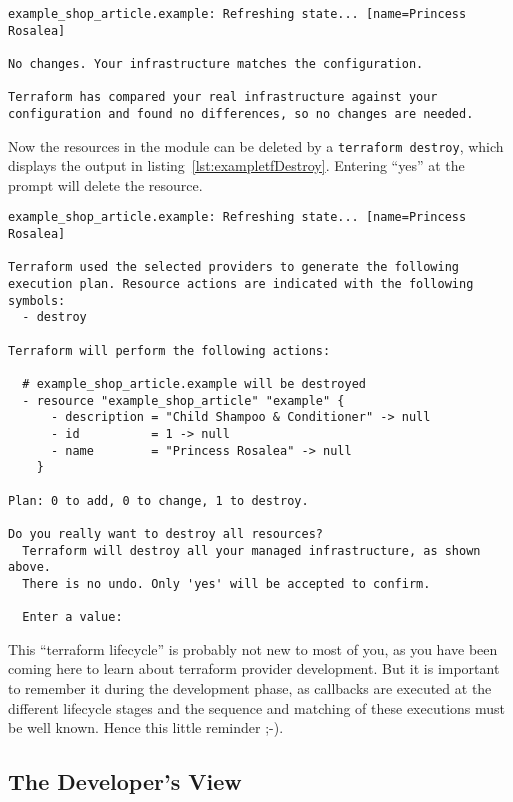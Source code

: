 \documentclass[paper=a4,11pt,numbers=noenddot]{article}
\begin{document}
\begin{lstlisting}[label=lst:exampletfPlanInSync]
example_shop_article.example: Refreshing state... [name=Princess Rosalea]

No changes. Your infrastructure matches the configuration.

Terraform has compared your real infrastructure against your configuration and found no differences, so no changes are needed.
\end{lstlisting}

Now the resources in the module can be deleted by a \verb'terraform destroy', which displays the output in listing~\ref{lst:exampletfDestroy}. Entering ``yes'' at the prompt will delete the resource.

\begin{lstlisting}[label=lst:exampletfDestroy]
example_shop_article.example: Refreshing state... [name=Princess Rosalea]

Terraform used the selected providers to generate the following execution plan. Resource actions are indicated with the following symbols:
  - destroy

Terraform will perform the following actions:

  # example_shop_article.example will be destroyed
  - resource "example_shop_article" "example" {
      - description = "Child Shampoo & Conditioner" -> null
      - id          = 1 -> null
      - name        = "Princess Rosalea" -> null
    }

Plan: 0 to add, 0 to change, 1 to destroy.

Do you really want to destroy all resources?
  Terraform will destroy all your managed infrastructure, as shown above.
  There is no undo. Only 'yes' will be accepted to confirm.

  Enter a value:
\end{lstlisting}

This ``terraform lifecycle'' is probably not new to most of you, as you have been coming here to learn about terraform provider development. But it is important to remember it during the development phase, as callbacks are executed at the different lifecycle stages and the sequence and matching of these executions must be well known. Hence this little reminder ;-).

\subsection{The Developer's View}
\label{subsec:developers-view}
\end{document}
